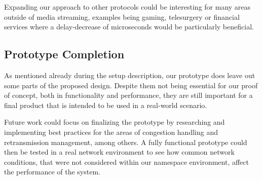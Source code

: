 Expanding our approach to other protocols could be interesting for 
many areas outside of media streaming, examples being gaming, 
telesurgery or financial services where a delay-decrease of 
microseconds would be particularly beneficial.

\subsection{Prototype Completion}\label{sec:prototype_completion}
As mentioned already during the setup description, our prototype 
does leave out some parts of the proposed design.
Despite them not being essential for our proof of concept,
both in functionality and performance, they are still important
for a final product that is intended to be used in a real-world
scenario.

Future work could focus on finalizing the prototype by researching 
and implementing best practices for the areas of congestion handling
and retransmission management, among others.
A fully functional prototype could then be tested in a real network
environment to see how common network conditions, that were not considered
within our namespace environment, affect the performance of the system.

